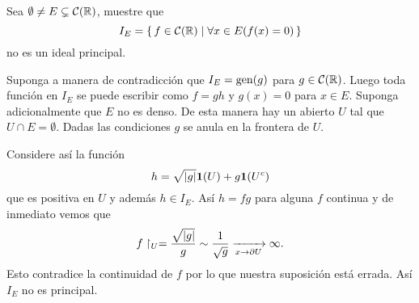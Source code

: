\documentclass[12pt]{memoir}
\begin{document}

\begin{Ej}
  Sea $\emptyset\neq E\subsetneq\mathcal{C}(\mathbb{R})$, muestre que
  $$I_E=\set{f\in\cC(\bR)\mid\forall x\in E(f(x)=0)}$$
  no es un ideal principal.
\end{Ej}

\begin{ptcbp}
Suponga a manera de contradicción que $I_E=\operatorname{gen}(g)$ para $g\in\mathcal{C}(\mathbb{R})$. Luego toda función en $I_E$ se puede escribir como $f=gh$ y $g(x)=0$ para $x\in E$. Suponga adicionalmente que $E$ no es denso. De esta manera hay un abierto $U$ tal que $U\cap E =\emptyset$. Dadas las condiciones $g$ se anula en la frontera de $U$.\par
Considere así la función
$$h=\sqrt{|g|}\mathbf{1}(U)+g\mathbf{1}(U^c)$$
que es positiva en $U$ y además $h\in I_E$. Así $h=fg$ para alguna $f$ continua y de inmediato vemos que
$$f\upharpoonright_{U}=\frac{\sqrt{|g|}}{g}\sim\frac{1}{\sqrt{g}}\xrightarrow[x\to\partial U]{}\infty.$$
Esto contradice la continuidad de $f$ por lo que nuestra suposición está errada. Así $I_E$ no es principal.
\end{ptcbp}
\end{document}
